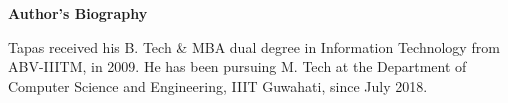 \chapter*{}
 \begin{center}
 {\Huge \bfseries Author's Biography}
 \vspace{1cm}
 \end{center}
 
 \onehalfspace
 \noindent Tapas received his B. Tech \& MBA dual degree in Information Technology from ABV-IIITM, in 2009. He has been pursuing M. Tech at the Department of Computer Science and Engineering, IIIT Guwahati, since July 2018.

 	  
